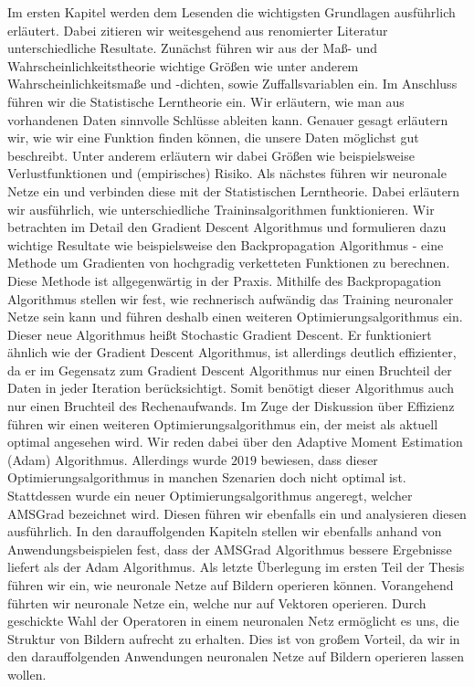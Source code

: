 \documentclass[11pt, twoside, a4paper]{book}
\theoremstyle{plain}
\theoremstyle{definition}
\theoremstyle{plain}
\begin{document}
Im ersten Kapitel werden dem Lesenden die wichtigsten Grundlagen ausführlich erläutert. Dabei zitieren wir weitesgehend aus renomierter Literatur unterschiedliche Resultate. Zunächst führen wir aus der Maß- und Wahrscheinlichkeitstheorie wichtige Größen wie unter anderem Wahrscheinlichkeitsmaße und -dichten, sowie Zuffallsvariablen ein.
Im Anschluss führen wir die Statistische Lerntheorie ein. Wir erläutern, wie man aus vorhandenen Daten sinnvolle Schlüsse ableiten kann. Genauer gesagt erläutern wir, wie wir eine Funktion finden können, die unsere Daten möglichst gut beschreibt. Unter anderem erläutern wir dabei Größen wie beispielsweise Verlustfunktionen und (empirisches) Risiko.
Als nächstes führen wir neuronale Netze ein und verbinden diese mit der Statistischen Lerntheorie. Dabei erläutern wir ausführlich, wie unterschiedliche Traininsalgorithmen funktionieren. Wir betrachten im Detail den \glqq Gradient Descent\grqq{} Algorithmus und formulieren dazu wichtige Resultate wie beispielsweise den \glqq Backpropagation\grqq{} Algorithmus - eine Methode um Gradienten von hochgradig verketteten Funktionen zu berechnen. Diese Methode ist allgegenwärtig in der Praxis.
Mithilfe des Backpropagation Algorithmus stellen wir fest, wie rechnerisch aufwändig das Training neuronaler Netze sein kann und führen deshalb einen weiteren Optimierungsalgorithmus ein. Dieser neue Algorithmus heißt \glqq Stochastic Gradient Descent\grqq{}. Er funktioniert ähnlich wie der Gradient Descent Algorithmus, ist allerdings deutlich effizienter, da er im Gegensatz zum Gradient Descent Algorithmus nur einen Bruchteil der Daten in jeder Iteration berücksichtigt. Somit benötigt dieser Algorithmus auch nur einen Bruchteil des Rechenaufwands.
Im Zuge der Diskussion über Effizienz führen wir einen weiteren Optimierungsalgorithmus ein, der meist als aktuell optimal angesehen wird. Wir reden dabei über den \glqq Adaptive Moment Estimation\grqq{} (Adam) Algorithmus. Allerdings wurde $2019$ bewiesen, dass dieser Optimierungsalgorithmus in manchen Szenarien doch nicht optimal ist. Stattdessen wurde ein neuer Optimierungsalgorithmus angeregt, welcher \glqq AMSGrad\grqq{} bezeichnet wird. Diesen führen wir ebenfalls ein und analysieren diesen ausführlich. In den darauffolgenden Kapiteln stellen wir ebenfalls anhand von Anwendungsbeispielen fest, dass der AMSGrad Algorithmus bessere Ergebnisse liefert als der Adam Algorithmus.
Als letzte Überlegung im ersten Teil der Thesis führen wir ein, wie neuronale Netze auf Bildern operieren können. Vorangehend führten wir neuronale Netze ein, welche nur auf Vektoren operieren. Durch geschickte Wahl der Operatoren in einem neuronalen Netz ermöglicht es uns, die Struktur von Bildern aufrecht zu erhalten. Dies ist von großem Vorteil, da wir in den darauffolgenden Anwendungen neuronalen Netze auf Bildern operieren lassen wollen.
\end{document}
